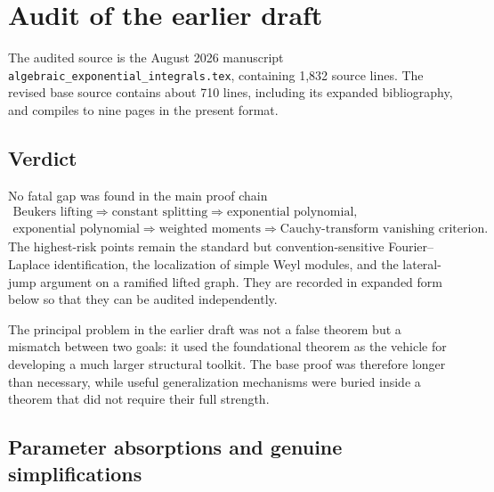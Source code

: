\documentclass[11pt]{article}
\numberwithin{equation}{section}
\theoremstyle{definition}
\theoremstyle{remark}
\begin{document}
\section{Audit of the earlier draft}

The audited source is the August 2026 manuscript
\texttt{algebraic\_exponential\_integrals.tex}, containing 1,832 source
lines.  The revised base source contains about 710 lines, including
its expanded bibliography, and compiles to nine pages in the present format.

\subsection{Verdict}

No fatal gap was found in the main proof chain
\[
\begin{gathered}
\text{Beukers lifting}
\Longrightarrow
\text{constant splitting}
\Longrightarrow
\text{exponential polynomial},\\
\text{exponential polynomial}
\Longrightarrow
\text{weighted moments}
\Longrightarrow
\text{Cauchy-transform vanishing criterion}.
\end{gathered}
\]
The highest-risk points remain the standard but convention-sensitive
Fourier--Laplace identification, the localization of simple Weyl modules,
and the lateral-jump argument on a ramified lifted graph.  They are recorded
in expanded form below so that they can be audited independently.

The principal problem in the earlier draft was not a false theorem but a
mismatch between two goals: it used the foundational theorem as the vehicle
for developing a much larger structural toolkit.  The base proof was therefore
longer than necessary, while useful generalization mechanisms were buried
inside a theorem that did not require their full strength.

\subsection{Parameter absorptions and genuine simplifications}
\end{document}
